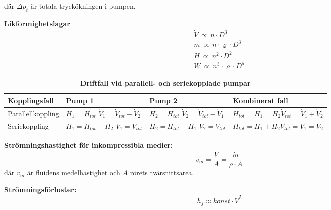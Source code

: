        där $ \Delta p_t $  är totala tryckökningen i pumpen. \par
	\textbf{Likformighetslagar } 
	\begin{align*} 
  & \dot{V} \: \propto \: n \cdot D^3 & \\ 
	& \dot{m} \: \propto \: n \cdot \varrho \cdot  D^3 \\ 
  & H \: \propto \: n^2 \cdot D^2  \\
  & \dot{W} \: \propto \: n^3 \cdot \varrho \cdot D^5  
	\end{align*}
	\begin{table}[ht]
    \caption*{\textbf{Driftfall vid parallell- och seriekopplade pumpar}}
    \centering
    \begin{tabularx}{\linewidth}{X p{3cm} p{3cm} p{3cm}}
        \hline
        Kopplingsfall & Pump 1 & Pump 2 & Kombinerat fall \\
        \hline
        Parallellkoppling 
        							& $H_1 = H_{tot}$ \newline $\dot{V}_1=\dot{V}_{tot} - \dot{V}_{2}$  
        							& $H_2 = H_{tot}$ \newline $\dot{V}_2=\dot{V}_{tot} - \dot{V}_{1}$
        							& $H_{tot}=H_1 = H_2$\newline $\dot{V}_{tot}=\dot{V}_{1}+\dot{V}_{2}$\\
        Seriekoppling 
        							& $H_1=H_{tot} - H_{2}$ \newline $\dot{V}_1 = \dot{V}_{tot}$ 
        							& $H_2=H_{tot} - H_{1}$ \newline $\dot{V}_2 = \dot{V}_{tot}$ 
        							& $H_{tot}=H_1 + H_2$\newline $\dot{V}_{tot}=\dot{V}_{1}=\dot{V}_{2}$\\
        \hline
    \end{tabularx}
\end{table}
\par
	\textbf{Strömningshastighet för inkompressibla medier: } 
	\begin{equation*}
    v_m = \dfrac{\dot{V}}{A} =  \dfrac{\dot{m}}{\rho \cdot A}
	\end{equation*}
		där $v_m$ är fluidens medelhastighet och $A$ rörets tvärsnittsarea.\par 
\par
	\textbf{Strömningsförluster: } 
	\begin{equation*}
		h_f \approx konst \cdot \dot{V}^2
	\end{equation*}

